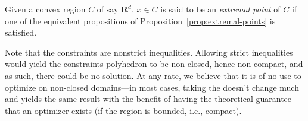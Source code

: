 \begin{definition}
    Given a convex region $ C $ of say $ \mathbf R^d $, $ x \in C $ is said to be an \textit{extremal point} of $ C $ if one of the equivalent propositions of Proposition~\ref{prop:extremal-points} is satisfied.
\end{definition}

\begin{remark}
    Note that the constraints are nonstrict inequalities. Allowing strict inequalities would yield the constraints polyhedron to be non-closed, hence non-compact, and as such, there could be no solution. At any rate, we believe that it is of no use to optimize on non-closed domains---in most cases, taking the doesn't change much and yields the same result with the benefit of having the theoretical guarantee that an optimizer exists (if the region is bounded, i.e., compact).
\end{remark}


